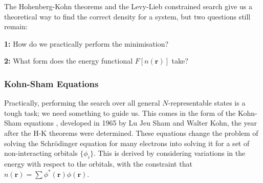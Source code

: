 \documentclass[12pt]{article}
\begin{document}
The Hohenberg-Kohn theorems and the Levy-Lieb constrained search give us a theoretical way to find the correct density for a system, but two questions still remain: 
\begin{displayquote}
\textbf{1:} How do we practically perform the minimisation?

\textbf{2:} What form does the energy functional $F[n(\mathbf r)]$ take?
\end{displayquote}
\subsubsection{Kohn-Sham Equations}
Practically, performing the search over all general $N$-representable states is a tough task; we need something to guide us. 
This comes in the form of the Kohn-Sham equations \cite{kohn1965self}, developed in 1965 by Lu Jeu Sham and Walter Kohn, the year after the H-K theorems were determined. 
These equations change the problem of solving the Schr\"{o}dinger equation for many electrons into solving it for a set of non-interacting orbitals $\{\phi_i\}$. This is derived by considering variations in the energy with respect to the orbitals, with the constraint that $n(\mathbf r) = \sum \phi^*(\mathbf r)\phi(\mathbf r)$.
\end{document}
